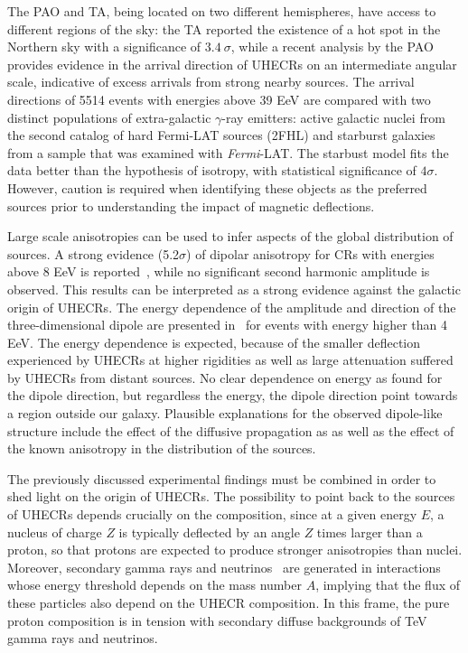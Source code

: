 \documentclass{PoS}
\begin{document}
The PAO and TA, being located on two different hemispheres, have access to different regions of the sky: the TA reported the existence of a hot spot in the Northern sky with a significance of $3.4~\sigma$, while 
a recent analysis by the PAO~\cite{Aab:2018chp} provides evidence in the arrival direction of
UHECRs on an intermediate angular scale, indicative of excess arrivals from strong nearby sources. 
The arrival directions of 5514 events with energies above 39 EeV are compared
with two distinct populations of extra-galactic $\gamma$-ray emitters: active galactic nuclei from the second catalog of hard Fermi-LAT sources (2FHL) and starburst galaxies from a sample that was examined with \textit{Fermi}-LAT. The starbust model fits the data better than the hypothesis of isotropy, with statistical significance of $4\sigma$. However, caution is required when identifying these objects as the preferred 
sources prior to understanding the impact of magnetic deflections. 

Large scale anisotropies can be used to infer aspects of the global distribution of sources. A strong evidence (5.2$\sigma$) of dipolar anisotropy for CRs with energies above 8 EeV is reported~\cite{Aab:2017tyv}, while no significant second harmonic amplitude is observed. This results can be interpreted as a strong evidence against the galactic origin of UHECRs. The energy dependence of the amplitude and direction of the three-dimensional dipole are presented in~\cite{Aab:2018mmi} for events with energy higher than 4 EeV. The energy dependence is expected, because of the smaller deflection experienced
by UHECRs at higher rigidities as well as large attenuation suffered by UHECRs from distant sources.  No clear dependence on energy as found for the dipole direction, but regardless the energy, the dipole direction point towards a region outside our galaxy. 
Plausible explanations for the observed dipole-like structure
include the effect of the diffusive propagation as 
as well as the effect of the known anisotropy in the distribution of the sources. 



The previously discussed experimental findings must be combined in order to shed light on the origin of UHECRs. The possibility to point back to the sources of UHECRs depends crucially on the composition, since  
at a given energy $E$, a nucleus of charge $Z$ is typically deflected by an angle $Z$ times larger than a proton, so that protons are expected to produce stronger anisotropies than nuclei. 
Moreover, secondary gamma rays and neutrinos~\cite{AlvesBatista} are generated in 
interactions whose energy threshold depends on the mass number $A$, implying that the flux of these particles also depend on the UHECR composition. In this frame, the pure proton composition is in tension with secondary diffuse backgrounds of TeV gamma rays and neutrinos. 
\end{document}
